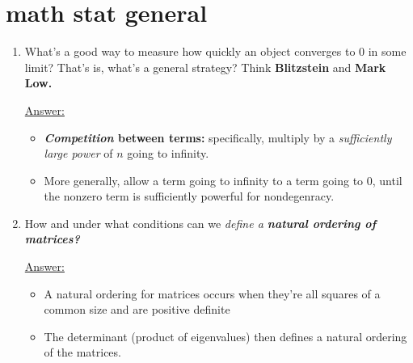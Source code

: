 \documentclass{article}
\newenvironment{QandA}{\begin{enumerate}[label=\bfseries Q\arabic*.]}
                       {\end{enumerate}}
\newenvironment{answered}{\par\normalfont\underline{Answer:}}{}
\begin{document}
\section{math stat general}
\begin{QandA}
  \item{What's a good way to measure how quickly an object converges to 0 in some limit? That's is, what's a general strategy? Think \textbf{Blitzstein} and \textbf{Mark Low.}}
    \begin{answered}
    \begin{itemize}
      \item{\textbf{\textit{Competition} between terms:} specifically, multiply by a \textit{sufficiently large power} of $n$ going to infinity.}
      \item{More generally, allow a term going to infinity to  a term going to 0, until the nonzero term is sufficiently powerful for nondegenracy.}
    \end{itemize}
    \end{answered}
  \item{How and under what conditions can we \textit{define a \textbf{natural ordering of matrices?}}}
    \begin{answered}
    \begin{itemize}
      \item{A natural ordering for matrices occurs when they're all squares of a common size and are positive definite}
      \item{The determinant (product of eigenvalues) then defines a natural ordering of the matrices.}
    \end{itemize}
    \end{answered}
\end{QandA}
\end{document}
